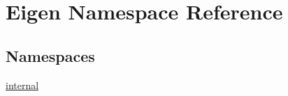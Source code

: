 \hypertarget{namespaceEigen}{}\section{Eigen Namespace Reference}
\label{namespaceEigen}
\subsection*{Namespaces}
\begin{DoxyCompactItemize}
\item 
 \hyperlink{namespaceEigen_1_1internal}{internal}
\end{DoxyCompactItemize}
